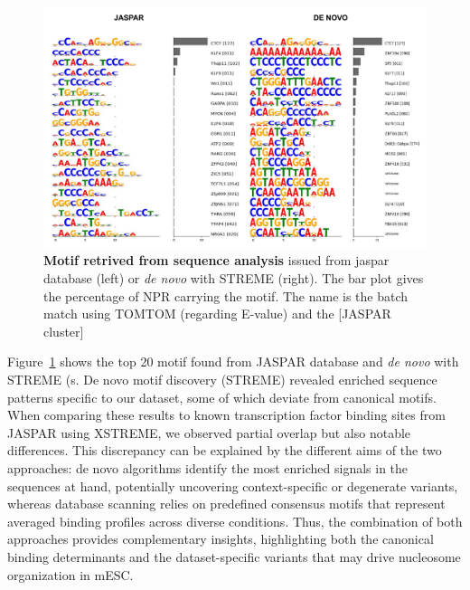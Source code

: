 \documentclass[11pt]{book}
\begin{document}
\begin{figure}[htbp]
    \centering
    \includegraphics[width=\textwidth]{Figures/Results/recap_xstreme.pdf}
    \caption{\textbf{Motif retrived from sequence analysis} issued from jaspar database (left) or \textit{de novo} with STREME (right). The bar plot gives the percentage of NPR carrying the motif. The name is the batch match using TOMTOM (regarding E-value) and the [JASPAR cluster]}
    \label{fig:recap_xstreme}
\end{figure}

Figure~\ref{fig:recap_xstreme} shows the top 20 motif found from JASPAR database and \textit{de novo} with STREME (s. De novo motif discovery (STREME) revealed enriched sequence patterns specific to our dataset, some of which deviate from canonical motifs. When comparing these results to known transcription factor binding sites from JASPAR using XSTREME, we observed partial overlap but also notable differences. This discrepancy can be explained by the different aims of the two approaches: de novo algorithms identify the most enriched signals in the sequences at hand, potentially uncovering context-specific or degenerate variants, whereas database scanning relies on predefined consensus motifs that represent averaged binding profiles across diverse conditions. Thus, the combination of both approaches provides complementary insights, highlighting both the canonical binding determinants and the dataset-specific variants that may drive nucleosome organization in mESC.
\end{document}
